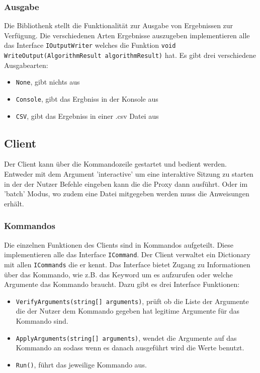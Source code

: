\subsubsection{Ausgabe}

Die Bibliothenk stellt die Funktionalität zur Ausgabe von Ergebnissen zur Verfügung. Die verschiedenen Arten Ergebnisse auszugeben implementieren alle
das Interface \verb|IOutputWriter| welches die Funktion \verb|void WriteOutput(AlgorithmResult algorithmResult)| hat. Es gibt drei verschiedene Ausgabearten:

\begin{itemize}
  \item \verb|None|, gibt nichts aus
  \item \verb|Console|, gibt das Ergbniss in der Konsole aus
  \item \verb|CSV|, gibt das Ergebniss in einer .csv Datei aus
\end{itemize}


\subsection{Client}

Der Client kann über die Kommandozeile gestartet und bedient werden. Entweder mit dem Argument 'interactive' um eine interaktive Sitzung zu starten
in der der Nutzer Befehle eingeben kann die die Proxy dann ausführt. Oder im 'batch' Modus, wo zudem eine Datei mitgegeben werden muss die Anweisungen erhält.

\subsubsection{Kommandos}

Die einzelnen Funktionen des Clients sind in Kommandos aufgeteilt.
Diese implementieren alle das Interface \verb|ICommand|. Der Client verwaltet ein Dictionary mit allen \verb|ICommands| die er kennt.
Das Interface bietet Zugang zu Informationen über das Kommando, wie z.B. das Keyword um es aufzurufen oder welche Argumente das Kommando braucht.
Dazu gibt es drei Interface Funktionen:

\begin{itemize}
  \item \verb|VerifyArguments(string[] arguments)|, prüft ob die Liste der Argumente die der Nutzer dem Kommando gegeben hat legitime Argumente für das Kommando sind.
  \item \verb|ApplyArguments(string[] arguments)|, wendet die Argumente auf das Kommando an sodass wenn es danach ausgeführt wird die Werte benutzt.
  \item \verb|Run()|, führt das jeweilige Kommando aus.
\end{itemize}


